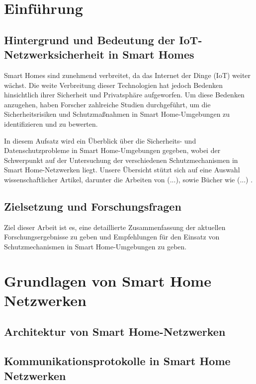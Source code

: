 
\usepackage{enumitem}
\usepackage{cite}
    
\usepackage{natbib}
\newcommand{\dozent}{Dr. Larissa Groth}
\newcommand{\veranstaltung}{IoT Network Security}
\newcommand{\semester}{SoSe23}
\newcommand{\studenten}{Zohreh Asadi, Aiman Al-Hazmi}



\tableofcontents
\newpage

\section{Einführung}
\subsection{Hintergrund und Bedeutung der IoT-Netzwerksicherheit in Smart Homes
}
Smart Homes sind zunehmend verbreitet, da das Internet der Dinge (IoT) weiter wächst. Die weite Verbreitung dieser Technologien hat jedoch Bedenken hinsichtlich ihrer Sicherheit und Privatsphäre aufgeworfen. Um diese Bedenken anzugehen, haben Forscher zahlreiche Studien durchgeführt, um die Sicherheitsrisiken und Schutzmaßnahmen in Smart Home-Umgebungen zu identifizieren und zu bewerten.

In diesem Aufsatz wird ein Überblick über die Sicherheits- und Datenschutzprobleme in Smart Home-Umgebungen gegeben, wobei der Schwerpunkt auf der Untersuchung der verschiedenen Schutzmechanismen in Smart Home-Netzwerken liegt. Unsere Übersicht stützt sich auf eine Auswahl wissenschaftlicher Artikel, darunter die Arbeiten von (...), sowie Bücher wie (...) . 
\subsection{Zielsetzung und Forschungsfragen}
Ziel dieser Arbeit ist es, eine detaillierte Zusammenfassung der aktuellen Forschungsergebnisse zu geben und Empfehlungen für den Einsatz von Schutzmechanismen in Smart Home-Umgebungen zu geben.

\newpage
\section{Grundlagen von Smart Home Netzwerken}

\subsection{Architektur von Smart Home-Netzwerken}
\subsection{Kommunikationsprotokolle in Smart Home Netzwerken}
